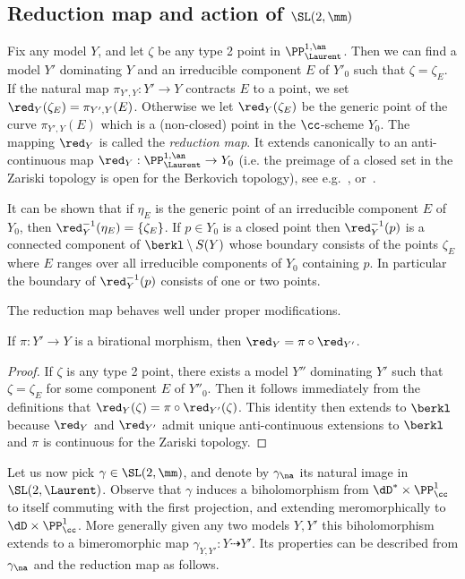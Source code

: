 \subsection{Reduction map and action of \texorpdfstring{$ \SL(2,\mm)$}{SL(2, mm)}}\label{subs:reduction}

Fix any model $Y$, and let $\zeta$ be any type 2 point in $\PP^{1,\an}_{\Laurent}$. Then we can find a model $Y'$ dominating $Y$ and an irreducible component $E$ of $Y'_0$ such that $\zeta = \zeta_E$. If the natural map $\pi_{Y',Y}: Y' \to Y$ contracts $E$ to a point, we set $\red_Y(\zeta_E) = \pi_{Y',Y}(E)$. Otherwise we let $\red_Y(\zeta_E)$ be the generic point of the curve $\pi_{Y',Y}(E)$ which is a (non-closed) point in the $\cc$-scheme $Y_0$. The mapping $\red_Y$ is called the \emph{reduction map}. It extends canonically to an anti-continuous map $\red_Y: \PP^{1,\an}_{\Laurent}\to Y_0$ (i.e. the preimage of a closed set in the Zariski topology is open for the Berkovich topology), see e.g.~\cite[\S 5.2.4]{temkin}, or~\cite[\S 4.2]{demarco-faber-2}.

It can be shown that if $\eta_E$ is the generic point of an irreducible component $E$ of $Y_0$, then $\red_Y^{-1}(\eta_E) = \{ \zeta_E\}$. If $p\in Y_0$ is a closed point then $\red_Y^{-1}(p)$ is a connected component of $\berkl\setminus {S}(Y)$ whose boundary consists of the points $\zeta_E$ where $E$ ranges over all irreducible components of $Y_0$ containing $p$. In particular the boundary of $\red_Y^{-1}(p)$ consists of one or two points.

The reduction map behaves well under proper modifications.

\begin{lemm}\label{lem:reduction modification}
If $\pi: Y'\to Y$ is a birational morphism, then $\red_Y = \pi\circ \red_{Y'}$.
\end{lemm}

\begin{proof}
If $\zeta$ is any type 2 point, there exists a model $Y''$ dominating $Y'$ such that $\zeta = \zeta_E$ for some component $E$ of $Y''_0$. Then it follows immediately from the definitions that $\red_Y (\zeta)= \pi\circ \red_{Y'}(\zeta)$. This identity then extends to $\berkl$ because $\red_Y$ and $\red_{Y'}$ admit unique anti-continuous extensions to $\berkl$ and $\pi$ is continuous for the Zariski topology.
\end{proof}

Let us now pick $\gamma \in \SL(2, \mm)$, and denote by $\gamma_\na$ its natural image in $\SL(2, \Laurent)$. Observe that $\gamma$ induces a biholomorphism from $\dD^*\times \PP^1_\cc$ to itself commuting with the first projection, and extending meromorphically to $\dD \times \PP^1_\cc$. More generally given any two models $Y,Y'$ this biholomorphism extends to a bimeromorphic map $\gamma_{Y,Y'}: Y \dashrightarrow Y'$. Its properties can be described from $\gamma_\na$ and the reduction map as follows.


